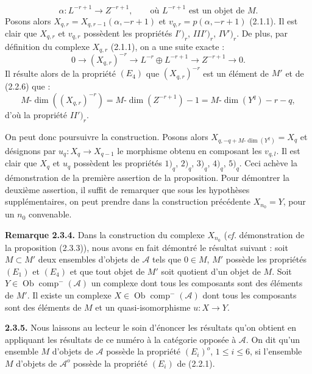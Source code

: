 \clearpage
{}%
\begingroup\small\setlength{\parskip}{0pt}\setlength{\emergencystretch}{1.5em}
\setlength{\abovedisplayskip}{4pt plus 2pt minus 2pt}%
\setlength{\belowdisplayskip}{4pt plus 2pt minus 2pt}%

\[
\alpha\colon L^{-r+1}\longrightarrow Z^{-r+1},
\qquad\text{où }L^{-r+1}\text{ est un objet de }M.
\]
Posons alors
$X_{q,r}=X_{q,r-1}(\alpha,-r+1)$ et
$v_{q,r}=p(\alpha,-r+1)$ (2.1.1). Il est clair que $X_{q,r}$ et
$v_{q,r}$ possèdent les propriétés $I')_r$,
$III')_r$, $IV')_r$. De plus, par définition du
complexe $X_{q,r}$ (2.1.1), on a une suite exacte :
\[
0\longrightarrow (X_{q,r})^{-r}\longrightarrow
L^{-r}\oplus L^{-r+1}\longrightarrow Z^{-r+1}\longrightarrow0.
\]
Il résulte alors de la propriété $(E_4)$ que $(X_{q,r})^{-r}$ est un
élément de $M'$ et de (2.2.6) que :
\[
M\text{-}\dim((X_{q,r})^{-r})
=M\text{-}\dim(Z^{-r+1})-1
=M\text{-}\dim(Y^q)-r-q,
\]
d'où la propriété $II')_r$.

On peut donc poursuivre la construction. Posons alors
$X_{q,-q+M\text{-}\dim(Y^q)}=X_q$ et désignons par
$u_q\colon X_q\longrightarrow X_{q-1}$ le morphisme obtenu en composant
les $v_{q,l}$. Il est clair que $X_q$ et $u_q$ possèdent les propriétés
$1)_q$, $2)_q$, $3)_q$, $4)_q$, $5)_q$. Ceci achève la démonstration de
la première assertion de la proposition. Pour démontrer la deuxième
assertion, il suffit de remarquer que sous les hypothèses supplémentaires,
on peut prendre dans la construction précédente $X_{n_0}=Y$, pour un
$n_0$ convenable.

\medskip\noindent\textbf{Remarque 2.3.4.}\quad
Dans la construction du complexe $X_{n_0}$ (\emph{cf.} démonstration de la
proposition (2.3.3)), nous avons en fait démontré le résultat suivant :
soit $M\subset M'$ deux ensembles d'objets de $\mathcal A$ tels que
$0\in M$, $M'$ possède les propriétés $(E_1)$ et $(E_4)$ et que tout
objet de $M'$ soit quotient d'un objet de $M$. Soit
$Y\in\operatorname{Ob}\operatorname{comp}^{-}(\mathcal A)$ un complexe
dont tous les composants sont des éléments de $M'$. Il existe un complexe
$X\in\operatorname{Ob}\operatorname{comp}^{-}(\mathcal A)$ dont tous les
composants sont des éléments de $M$ et un quasi-isomorphisme
$u\colon X\longrightarrow Y$.

\medskip\noindent\textbf{2.3.5.}\quad
Nous laissons au lecteur le soin d'énoncer les résultats qu'on obtient en
appliquant les résultats de ce numéro à la catégorie opposée à $\mathcal A$.
On dit qu'un ensemble $M$ d'objets de $\mathcal A$ possède la propriété
$(E_i)^o$, $1\leq i\leq6$, si l'ensemble $M$ d'objets de $\mathcal A^o$
possède la propriété $(E_i)$ de (2.2.1).

